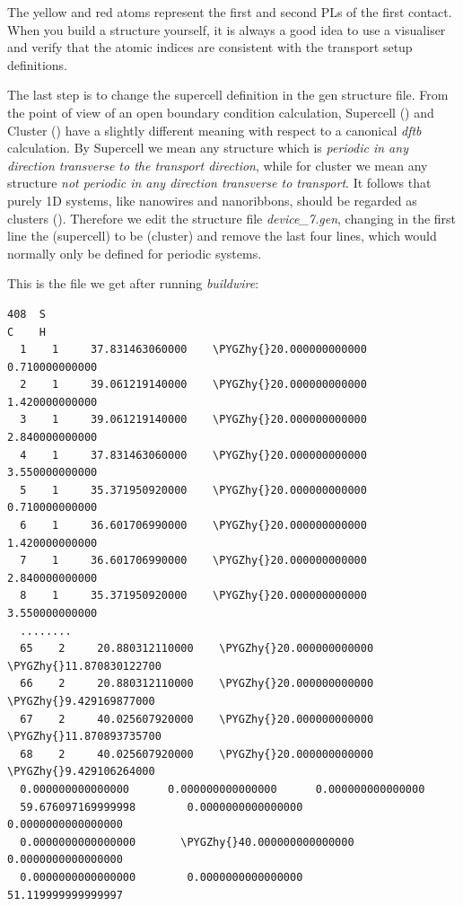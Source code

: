 \documentclass[a4paper,11pt,english]{sphinxmanual}
\def\PYGZhy{\char`\-}
\begin{document}
{{The yellow and red atoms represent the first and second PLs of the
first contact. When you build a structure yourself, it is always a
good idea to use a visualiser and verify that the atomic indices are
consistent with the transport setup definitions.

The last step is to change the supercell definition in the gen
structure file. From the point of view of an open boundary condition
calculation, Supercell () and Cluster () have a slightly
different meaning with respect to a canonical \emph{dftb} calculation. By
Supercell we mean any structure which is \emph{periodic in any direction
transverse to the transport direction}, while for cluster we mean any
structure \emph{not periodic in any direction transverse to transport}. It
follows that purely 1D systems, like nanowires and nanoribbons, should
be regarded as clusters (). Therefore we edit the structure file
\emph{device\_7.gen}, changing in the first line the  (supercell) to be
 (cluster) and remove the last four lines, which would normally
only be defined for periodic systems.

This is the file we get after running \emph{buildwire}:

\begin{Verbatim}[commandchars=\\\{\}]
408  S
C    H
  1    1     37.831463060000    \PYGZhy{}20.000000000000      0.710000000000
  2    1     39.061219140000    \PYGZhy{}20.000000000000      1.420000000000
  3    1     39.061219140000    \PYGZhy{}20.000000000000      2.840000000000
  4    1     37.831463060000    \PYGZhy{}20.000000000000      3.550000000000
  5    1     35.371950920000    \PYGZhy{}20.000000000000      0.710000000000
  6    1     36.601706990000    \PYGZhy{}20.000000000000      1.420000000000
  7    1     36.601706990000    \PYGZhy{}20.000000000000      2.840000000000
  8    1     35.371950920000    \PYGZhy{}20.000000000000      3.550000000000
  ........
  65    2     20.880312110000    \PYGZhy{}20.000000000000    \PYGZhy{}11.870830122700
  66    2     20.880312110000    \PYGZhy{}20.000000000000     \PYGZhy{}9.429169877000
  67    2     40.025607920000    \PYGZhy{}20.000000000000    \PYGZhy{}11.870893735700
  68    2     40.025607920000    \PYGZhy{}20.000000000000     \PYGZhy{}9.429106264000
  0.000000000000000      0.000000000000000      0.000000000000000
  59.676097169999998        0.0000000000000000        0.0000000000000000
  0.0000000000000000       \PYGZhy{}40.000000000000000        0.0000000000000000
  0.0000000000000000        0.0000000000000000        51.119999999999997
\end{Verbatim}

}}
\end{document}
